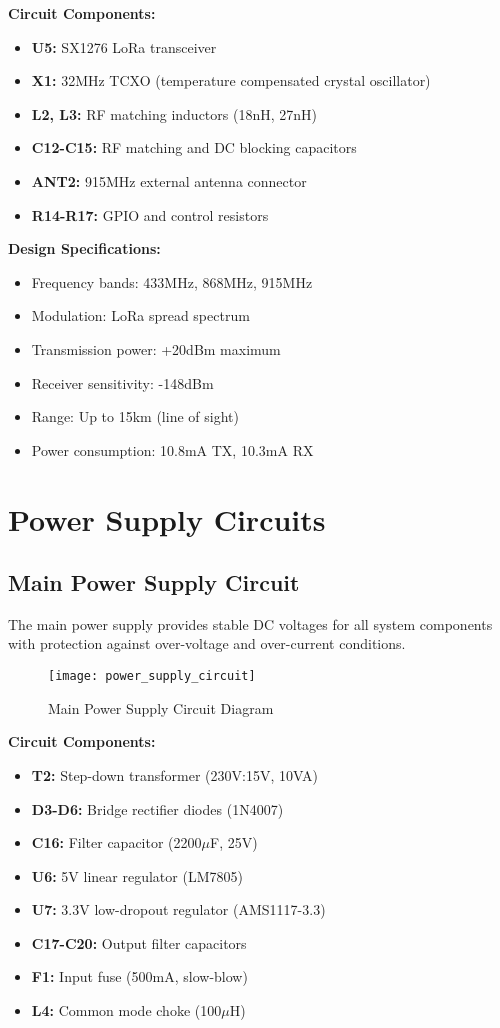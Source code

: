 \textbf{Circuit Components:}
\begin{itemize}
\item \textbf{U5:} SX1276 LoRa transceiver
\item \textbf{X1:} 32MHz TCXO (temperature compensated crystal oscillator)
\item \textbf{L2, L3:} RF matching inductors (18nH, 27nH)
\item \textbf{C12-C15:} RF matching and DC blocking capacitors
\item \textbf{ANT2:} 915MHz external antenna connector
\item \textbf{R14-R17:} GPIO and control resistors
\end{itemize}

\textbf{Design Specifications:}
\begin{itemize}
\item Frequency bands: 433MHz, 868MHz, 915MHz
\item Modulation: LoRa spread spectrum
\item Transmission power: +20dBm maximum
\item Receiver sensitivity: -148dBm
\item Range: Up to 15km (line of sight)
\item Power consumption: 10.8mA TX, 10.3mA RX
\end{itemize}

\section{Power Supply Circuits}
\label{sec:power_supply_circuits}

\subsection{Main Power Supply Circuit}
\label{subsec:main_power_supply}

The main power supply provides stable DC voltages for all system components with protection against over-voltage and over-current conditions.

\begin{figure}[H]
\centering
\texttt{[image: power\_supply\_circuit]}
\caption{Main Power Supply Circuit Diagram}
\label{fig:power_supply_circuit}
\end{figure}

\textbf{Circuit Components:}
\begin{itemize}
\item \textbf{T2:} Step-down transformer (230V:15V, 10VA)
\item \textbf{D3-D6:} Bridge rectifier diodes (1N4007)
\item \textbf{C16:} Filter capacitor (2200$\mu$F, 25V)
\item \textbf{U6:} 5V linear regulator (LM7805)
\item \textbf{U7:} 3.3V low-dropout regulator (AMS1117-3.3)
\item \textbf{C17-C20:} Output filter capacitors
\item \textbf{F1:} Input fuse (500mA, slow-blow)
\item \textbf{L4:} Common mode choke (100$\mu$H)
\end{itemize}

